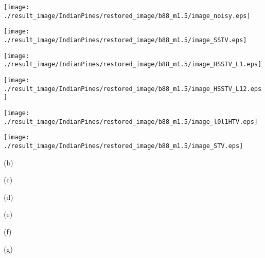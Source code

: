 \begin{figure*}[t]
    \begin{center}
        \begin{minipage}{0.150\hsize}
            \centerline{\texttt{[image: ./result\_image/IndianPines/restored\_image/b88\_m1.5/image\_noisy.eps]}} %
        \end{minipage}
        \begin{minipage}{0.150\hsize}
            \centerline{\texttt{[image: ./result\_image/IndianPines/restored\_image/b88\_m1.5/image\_SSTV.eps]}} %
        \end{minipage}
        \begin{minipage}{0.150\hsize}
            \centerline{\texttt{[image: ./result\_image/IndianPines/restored\_image/b88\_m1.5/image\_HSSTV\_L1.eps]}} %
        \end{minipage}
        \begin{minipage}{0.150\hsize}
            \centerline{\texttt{[image: ./result\_image/IndianPines/restored\_image/b88\_m1.5/image\_HSSTV\_L12.eps]}} %
        \end{minipage}
        \begin{minipage}{0.150\hsize}
            \centerline{\texttt{[image: ./result\_image/IndianPines/restored\_image/b88\_m1.5/image\_l0l1HTV.eps]}} %
        \end{minipage}
        \begin{minipage}{0.150\hsize}
        	\centerline{\texttt{[image: ./result\_image/IndianPines/restored\_image/b88\_m1.5/image\_STV.eps]}} %
        \end{minipage}

        \vspace{1mm}

		\begin{minipage}{0.150\hsize}
			\centerline{\small{(b)}}
		\end{minipage}
		\begin{minipage}{0.150\hsize}
			\centerline{\small{(c)}}
		\end{minipage}
		\begin{minipage}{0.150\hsize}
			\centerline{\small{(d)}}
		\end{minipage}
		\begin{minipage}{0.150\hsize}
			\centerline{\small{(e)}}
		\end{minipage}
        \begin{minipage}{0.150\hsize}
			\centerline{\small{(f)}}
		\end{minipage}
		\begin{minipage}{0.150\hsize}
			\centerline{\small{(g)}}
		\end{minipage}
  

\end{center}
\end{figure*}
